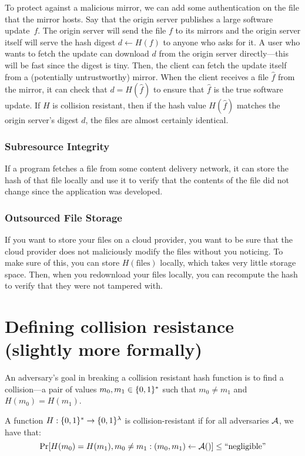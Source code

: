 To protect against a malicious mirror, we can add some authentication on the file that the mirror hosts.
Say that the origin server publishes a large software update~$f$.
The origin server will send the file $f$ to its mirrors and the origin
server itself will serve the hash digest $d\gets H(f)$ to anyone who asks for it.
A user who wants to fetch the update can download $d$ from the origin server directly---this
will be fast since the digest is tiny.
Then, the client can fetch the update itself from a (potentially untrustworthy) mirror.
When the client receives a file $\hat f$ from the mirror, it can check that $d = H(\hat f)$
to ensure that $\hat f$ is the true software update.
If $H$ is collision resistant, then if the hash value $H(\hat f)$ matches the origin server's digest $d$,
the files are almost certainly identical.

\subsubsection{Subresource Integrity}
If a program fetches a file from some content
delivery network, it can store the hash of that
file locally and use it to verify that the
contents of the file did not change since the
application was developed.

\subsubsection{Outsourced File Storage}
If you want to store your files on a cloud
provider, you want to be sure that the cloud
provider does not maliciously modify the files
without you noticing. To make sure of this, you
can store $H(\text{files})$ locally, which takes
very little storage space. Then, when you
redownload your files locally, you can recompute
the hash to verify that they were not tampered
with.

\section{Defining collision resistance (slightly more formally)}
An adversary's goal in breaking a collision
resistant hash function is to find a collision---a
pair of values $m_0, m_1 \in \{0,1\}^*$ such that
$m_0 \neq m_1$ and $H(m_0) = H(m_1)$.

\begin{definition}
	A function $H: \{0,1\}^* \rightarrow \{0,1\}^{\lambda}$ is collision-resistant 
  if for all  adversaries $\mathcal{A}$, we have that:
  \[ \Pr[H(m_0) = H(m_1), m_0 \neq m_1: (m_0, m_1) \leftarrow \mathcal{A}()] \leq \text{``negligible''} \]
\end{definition}

